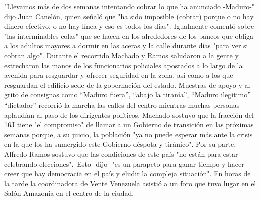 \documentclass{article}%
\begin{document}
\newline%
%
"Llevamos más de dos semanas intentando cobrar lo que ha anunciado {-}Maduro{-}" dijo Juan Canelón, quien señaló que "ha sido imposible (cobrar) porque o no hay dinero efectivo, o no hay línea y eso es todos los días".%
\newline%
%
Igualmente comentó sobre "las interminables colas" que se hacen en los alrededores de los bancos que obliga a los adultos mayores a dormir en las aceras y la calle durante días "para ver si cobran algo".%
\newline%
%
Durante el recorrido Machado y Ramos saludaron a la gente y estrecharon las manos de los funcionarios policiales apostados a lo largo de la avenida para resguardar y ofrecer seguridad en la zona, así como a los que resguardan el edificio sede de la gobernación del estado.%
\newline%
%
Muestras de apoyo y al grito de consignas como “Maduro fuera”, “abajo la tiranía”, “Maduro ilegitimo” “dictador” recorrió la marcha las calles del centro mientras muchas personas aplaudían al paso de los dirigentes políticos.%
\newline%
%
Machado sostuvo que la fracción del 16J tiene "el compromiso" de llamar a un Gobierno de transición en las próximas semanas porque, a su juicio, la población "ya no puede esperar más ante la crisis en la que los ha sumergido este Gobierno déspota y tiránico".%
\newline%
%
Por su parte, Alfredo Ramos sostuvo que las condiciones de este país "no están para estar celebrando elecciones".~Esto {-}dijo{-} "es un parapeto para ganar tiempo y hacer creer que hay democracia en el país y eludir la compleja situación".%
\newline%
%
En horas de la tarde la coordinadora de Vente Venezuela asistió a un foro que tuvo lugar en el Salón Amazonía en el centro de la ciudad.%
\newline%
%
\end{document}
